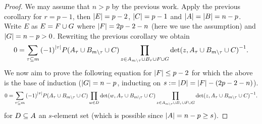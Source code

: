 \begin{proof}
    We may assume that $n>p$ by the previous work.
    Apply the previous corollary for $r=p-1$, then $\left|E\right|=p-2$, $\left|C\right|=p-1$ and $\left|A\right|=\left|B\right|=n-p$.
    Write $E$ as $E=F\cup G$ where $\left|F\right| = 2p-2-n$ (here we use the assumption) and $\left|G\right| = n-p>0$.
    Rewriting the previous corollary we obtain
    $$
  0 = \sum_{\tau\subseteq m}{{(-1)}^{\left|\tau\right|}P(A_{\tau}\cup B_{m\setminus\tau}\cup C)}\prod_{\substack{z\in A_{m\setminus\tau}\cup B_{\tau}\cup F\cup G}}{{\det(z,A_{\tau}\cup B_{m\setminus\tau}\cup C)}^{-1}}.
    $$
    We now aim to prove the following equation for $\left|F\right|\leq p-2$ for which the above is the base of induction ($\left|G\right|=n-p$, inducting on $s:=\left|D\right| = \left|F\right|-(2p-2-n)$).
    $$
  0 = \sum_{\tau\subseteq m}{{(-1)}^{\left|\tau\right|}P(A_{\tau}\cup B_{m\setminus\tau}\cup C)}\prod_{w\in D}{\det(w,A_{\tau}\cup B_{m\setminus\tau}\cup C)}\prod_{\substack{z\in A_{m\setminus\tau}\cup B_{\tau}\cup F\cup G}}{{\det(z,A_{\tau}\cup B_{m\setminus\tau}\cup C)}^{-1}}.
    $$
    for $D\subseteq A$ an $s$-element set (which is possible since $\left|A\right|=n-p\geq s$).
    

\end{proof}
